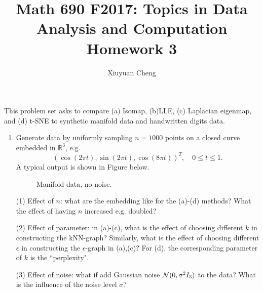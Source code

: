 \documentclass[english]{article}
\newcommand{\R}{\mathbb{R}}
\begin{document}
\title{Math 690 F2017: Topics in Data Analysis and Computation\\
Homework 3}

\author{Xiuyuan Cheng}

\date{}

\maketitle


This problem set asks to compare (a) Isomap, (b)LLE, 
(c) Laplacian eigenmap,
and (d) t-SNE 
to synthetic manifold data and handwritten digits data.

\begin{enumerate}

\item
Generate data by uniformly sampling $n=1000$ points on a closed curve embedded in $\R^3$, e.g.
\[
(\cos(2\pi t), \sin(2\pi t), \cos(8\pi t))^T,
\quad 0 \le t \le 1.
\]
A typical output is shown in Figure below. 

\begin{figure}[h]
\caption{
Manifold data, no noise.
}
\label{fig:1}
\end{figure}

(1) 
Effect of $n$:
what are the embedding like for the (a)-(d) methods? What the effect of having $n$ increased e.g. doubled?


(2) 
Effect of parameter:
in (a)-(c), what is the effect of choosing different $k$ in constructing the kNN-graph? 
Similarly, what is the effect of choosing different $\epsilon$ in constructing the $\epsilon$-graph in (a),(c)?
For (d), the corresponding parameter of $k$ is the ``perplexity".

(3) 
Effect of noise:
what if add Gaussian noise ${\cal N}(0, \sigma^2 I_3)$ to the data? What is the influence of the noise level $\sigma$? 


\end{enumerate}
\end{document}
